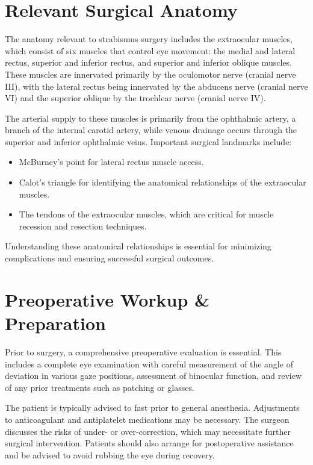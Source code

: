 \section*{Relevant Surgical Anatomy}
The anatomy relevant to strabismus surgery includes the extraocular muscles, which consist of six muscles that control eye movement: the medial and lateral rectus, superior and inferior rectus, and superior and inferior oblique muscles. These muscles are innervated primarily by the oculomotor nerve (cranial nerve III), with the lateral rectus being innervated by the abducens nerve (cranial nerve VI) and the superior oblique by the trochlear nerve (cranial nerve IV). 

The arterial supply to these muscles is primarily from the ophthalmic artery, a branch of the internal carotid artery, while venous drainage occurs through the superior and inferior ophthalmic veins. Important surgical landmarks include:

\begin{itemize}
  \item McBurney's point for lateral rectus muscle access.
  \item Calot's triangle for identifying the anatomical relationships of the extraocular muscles.
  \item The tendons of the extraocular muscles, which are critical for muscle recession and resection techniques.
\end{itemize}

Understanding these anatomical relationships is essential for minimizing complications and ensuring successful surgical outcomes.

\section*{Preoperative Workup \& Preparation}
Prior to surgery, a comprehensive preoperative evaluation is essential. This includes a complete eye examination with careful measurement of the angle of deviation in various gaze positions, assessment of binocular function, and review of any prior treatments such as patching or glasses. 

The patient is typically advised to fast prior to general anesthesia. Adjustments to anticoagulant and antiplatelet medications may be necessary. The surgeon discusses the risks of under- or over-correction, which may necessitate further surgical intervention. Patients should also arrange for postoperative assistance and be advised to avoid rubbing the eye during recovery.

